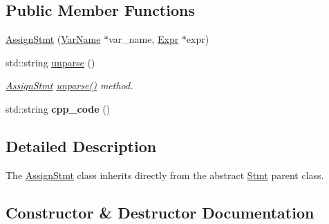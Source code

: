\subsection*{Public Member Functions}
\begin{DoxyCompactItemize}
\item 
\hyperlink{classfcal_1_1ast_1_1AssignStmt_af73e7e2328c592bf74621873480d063b}{Assign\+Stmt} (\hyperlink{classfcal_1_1ast_1_1VarName}{Var\+Name} $\ast$var\+\_\+name, \hyperlink{classfcal_1_1ast_1_1Expr}{Expr} $\ast$expr)
\item 
std\+::string \hyperlink{classfcal_1_1ast_1_1AssignStmt_ae58f8af8bc26ae0994d95ae266433ded}{unparse} ()
\begin{DoxyCompactList}\small\item\em \hyperlink{classfcal_1_1ast_1_1AssignStmt}{Assign\+Stmt} \hyperlink{classfcal_1_1ast_1_1AssignStmt_ae58f8af8bc26ae0994d95ae266433ded}{unparse()} method. \end{DoxyCompactList}\item 
std\+::string {\bfseries cpp\+\_\+code} ()\hypertarget{classfcal_1_1ast_1_1AssignStmt_a0d6dbae495e452e2d7fc6eb4b5fc41f6}{}\label{classfcal_1_1ast_1_1AssignStmt_a0d6dbae495e452e2d7fc6eb4b5fc41f6}

\end{DoxyCompactItemize}


\subsection{Detailed Description}
The \hyperlink{classfcal_1_1ast_1_1AssignStmt}{Assign\+Stmt} class inherits directly from the abstract \hyperlink{classfcal_1_1ast_1_1Stmt}{Stmt} parent class. 

\subsection{Constructor \& Destructor Documentation}
